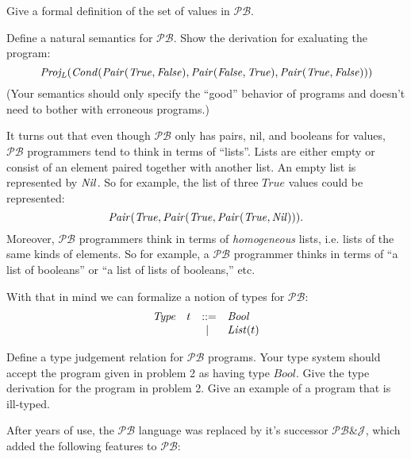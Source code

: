 \documentclass[11pt]{article}
\newcommand\Bool{\mathit{Bool}}
\newcommand\True{\mathit{True}}
\newcommand\False{\mathit{False}}
\newcommand\Plang{\mathcal{PB}}
\newcommand\PPlang{\mathcal{PB\&J}}
\begin{document}
\newpage
\begin{exercise}
Give a formal definition of the set of values in $\Plang$.
\end{exercise}
\vspace{1.2in}

\begin{exercise}
Define a natural semantics for $\Plang$. Show the derivation for
exaluating the program:
\[
\ProjL(\Cond(\Cons(\True,\False),\Cons(\False,\True),\Cons(\True,\False)))
\]
%
(Your semantics should only specify the ``good'' behavior of programs
and doesn't need to bother with erroneous programs.)
\end{exercise}

\newpage
It turns out that even though $\Plang$ only has pairs, nil, and
booleans for values, $\Plang$ programmers tend to think in terms of
``lists''.  Lists are either empty or consist of an element paired
together with another list.  An empty list is represented by $\mathit{Nil}$.  So
for example, the list of three $\True$ values could be represented:
\[
\Cons(\True,\Cons(\True,\Cons(\True,\Nil)))\text.
\]
%
Moreover, $\Plang$ programmers think in terms of \emph{homogeneous}
lists, i.e. lists of the same kinds of elements.  So for example, a
$\Plang$ programmer thinks in terms of ``a list of booleans'' or ``a
list of lists of booleans,'' etc.

With that in mind we can formalize a notion of types for $\Plang$:
\[
\begin{array}{lrcll}
 \mathit{Type} 
               & t & ::= & \Bool\\
               &   &  |\ & \List(t)
\end{array}
\]

\vspace{.5in}

\begin{exercise}
Define a type judgement relation for $\Plang$ programs.  Your type
system should accept the program given in problem 2 as having type
$\Bool$.  Give the type derivation for the program in problem 2.  Give
an example of a program that is ill-typed.
\end{exercise}


\newpage
After years of use, the $\Plang$ language was replaced by it's
successor $\PPlang$, which added the following features to $\Plang$:
\end{document}
